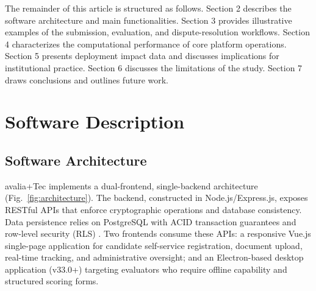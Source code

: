 \documentclass[preprint,12pt,a4paper]{elsarticle}
\begin{document}
The remainder of this article is structured as follows. Section 2 describes the software architecture and main functionalities. Section 3 provides illustrative examples of the submission, evaluation, and dispute-resolution workflows. Section 4 characterizes the computational performance of core platform operations. Section 5 presents deployment impact data and discusses implications for institutional practice. Section 6 discusses the limitations of the study. Section 7 draws conclusions and outlines future work.

\section{Software Description}

\subsection{Software Architecture}

avalia+Tec implements a dual-frontend, single-backend architecture (Fig.~\ref{fig:architecture}). The backend, constructed in Node.js/Express.js, exposes RESTful APIs that enforce cryptographic operations and database consistency. Data persistence relies on PostgreSQL with ACID transaction guarantees and row-level security (RLS) \citep{ISO27001}. Two frontends consume these APIs: a responsive Vue.js single-page application for candidate self-service registration, document upload, real-time tracking, and administrative oversight; and an Electron-based desktop application (v33.0+) targeting evaluators who require offline capability and structured scoring forms.
\end{document}
